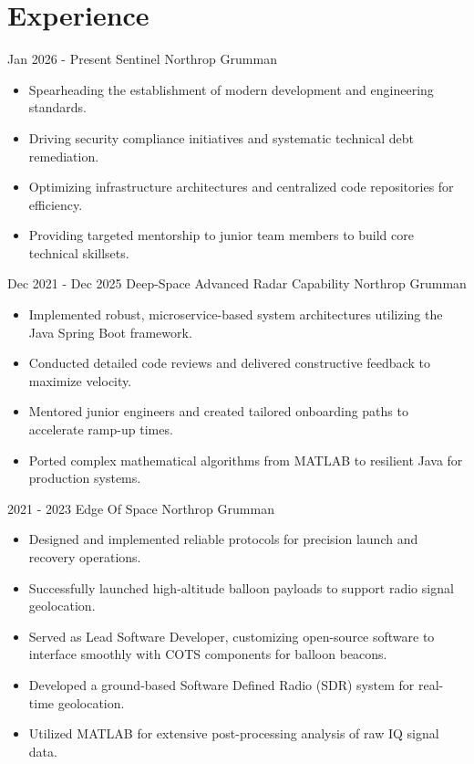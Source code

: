 \documentclass[]{src/friggeri-cv}
\begin{document}
\section{Experience}
\begin{entrylist}
  \entry
    {Jan 2026 - Present}
    {Sentinel}
    {Northrop Grumman}
    {\begin{itemize}
        \item Spearheading the establishment of modern development and engineering standards.
        \item Driving security compliance initiatives and systematic technical debt remediation.
        \item Optimizing infrastructure architectures and centralized code repositories for efficiency.
        \item Providing targeted mentorship to junior team members to build core technical skillsets.
    \end{itemize}}
  \entry
    {Dec 2021 - Dec 2025}
    {Deep-Space Advanced Radar Capability}
    {Northrop Grumman}
    {\begin{itemize}
        \item Implemented robust, microservice-based system architectures utilizing the Java Spring Boot framework.
        \item Conducted detailed code reviews and delivered constructive feedback to maximize velocity.
        \item Mentored junior engineers and created tailored onboarding paths to accelerate ramp-up times.
        \item Ported complex mathematical algorithms from MATLAB to resilient Java for production systems.
    \end{itemize}}
  \entry
    {2021 - 2023}
    {Edge Of Space}
    {Northrop Grumman}
    {\begin{itemize}
        \item Designed and implemented reliable protocols for precision launch and recovery operations.
        \item Successfully launched high-altitude balloon payloads to support radio signal geolocation.
        \item Served as Lead Software Developer, customizing open-source software to interface smoothly with COTS components for balloon beacons.
        \item Developed a ground-based Software Defined Radio (SDR) system for real-time geolocation.
        \item Utilized MATLAB for extensive post-processing analysis of raw IQ signal data.
    \end{itemize}}
\end{entrylist}
\end{document}
